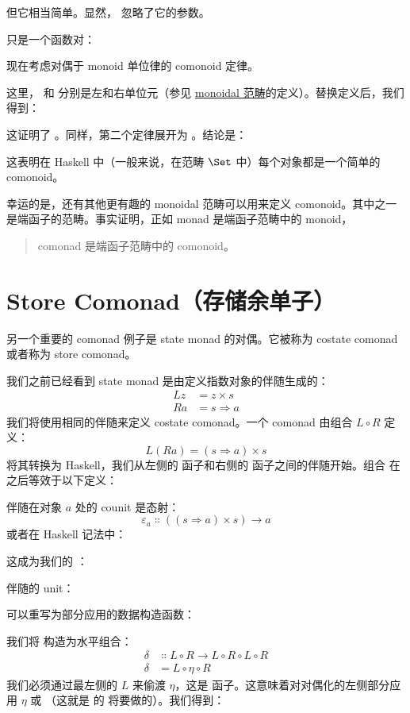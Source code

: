 但它相当简单。显然， 忽略了它的参数。

 只是一个函数对：

现在考虑对偶于 monoid 单位律的 comonoid 定律。

这里， 和  分别是左和右单位元（参见 \hyperref[monads-categorically]{monoidal 范畴}的定义）。替换定义后，我们得到：

这证明了 。同样，第二个定律展开为 。结论是：

这表明在 Haskell 中（一般来说，在范畴 $\Set$ 中）每个对象都是一个简单的 comonoid。

幸运的是，还有其他更有趣的 monoidal 范畴可以用来定义 comonoid。其中之一是端函子的范畴。事实证明，正如 monad 是端函子范畴中的 monoid，

\begin{quote}
  comonad 是端函子范畴中的 comonoid。
\end{quote}

\section{Store Comonad（存储余单子）}

另一个重要的 comonad 例子是 state monad 的对偶。它被称为 costate comonad 或者称为 store comonad。

我们之前已经看到 state monad 是由定义指数对象的伴随生成的：
\begin{align*}
  L z & = z\times{}s      \\
  R a & = s \Rightarrow a
\end{align*}
我们将使用相同的伴随来定义 costate comonad。一个 comonad 由组合 $L \circ R$ 定义：
\[L (R a) = (s \Rightarrow a)\times{}s\]
将其转换为 Haskell，我们从左侧的  函子和右侧的  函子之间的伴随开始。组合  在  之后等效于以下定义：

伴随在对象 $a$ 处的 counit 是态射：
\[\varepsilon_a \Colon ((s \Rightarrow a)\times{}s) \to a\]
或者在 Haskell 记法中：

这成为我们的 ：

伴随的 unit：

可以重写为部分应用的数据构造函数：

我们将  构造为水平组合：
\begin{align*}
  \delta & \Colon L \circ R \to L \circ R \circ L \circ R \\
  \delta & = L \circ \eta \circ R
\end{align*}
我们必须通过最左侧的 $L$ 来偷渡 $\eta$，这是  函子。这意味着对对偶化的左侧部分应用 $\eta$ 或 （这就是  的  将要做的）。我们得到：

